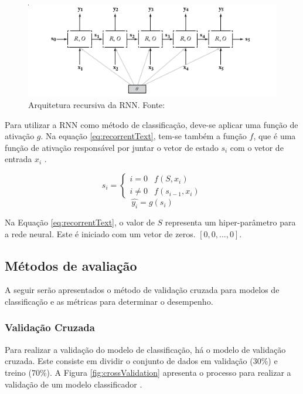 \begin{figure}[h]
	\centering
	\includegraphics[keepaspectratio=true,scale=0.8]{figuras/rnnText}
	\caption[Arquitetura recursiva da RNN]{Arquitetura recursiva da RNN. Fonte: \cite[Página 166]{GOLDBERG2017}}
	\label{fig:rnnText}
\end{figure}

Para utilizar a RNN como método de classificação, deve-se aplicar uma função de ativação $g$. Na equação \ref{eq:recorrentText}, tem-se também a função $f$, que é uma função de ativação responsável por juntar o vetor de estado $s_{i}$ com o vetor de entrada $x_{i}$ \cite{MIKOLOV2010}.

\begin{equation}
	\label{eq:recorrentText}
	s_{i} = 
    \begin{cases}
    	i = 0 & f(S, x_{i}) \\
        i \neq 0 & f(s_{i-1}, x_{i})
    \end{cases}
\end{equation}
\begin{equation*}
	\hat{y_{i}} = g(s_{i})
\end{equation*}

Na Equação \ref{eq:recorrentText}, o valor de $S$ representa um hiper-parâmetro para a rede neural. Este é iniciado com um vetor de zeros. $[0, 0, ..., 0]$.

\subsection{Métodos de avaliação}

A seguir serão apresentados o método de validação cruzada para modelos de classificação e as métricas para determinar o desempenho.

\subsubsection{Validação Cruzada}

Para realizar a validação do modelo de classificação, há o modelo de validação cruzada. Este consiste em dividir o conjunto de dados em validação (30\%) e treino (70\%). A Figura \ref{fig:crossValidation} apresenta o processo para realizar a validação de um modelo classificador \cite{BRINK2015}.

